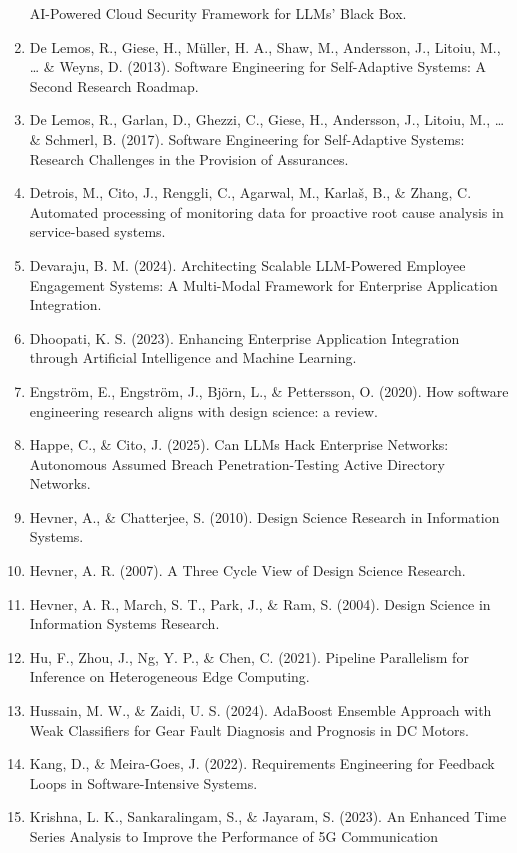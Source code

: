 \documentclass[
  a4paper,
  12pt,
  oneside,
  open=any,
  BCOR=12mm,
  DIV=14,
  parskip=half*,
  headsepline,
  footsepline,
  pointlessnumbers,
  liststotoc,
  numbers=noenddot,
  listof=totoc]{scrartcl}
\begin{document}
\begin{enumerate}
  AI-Powered Cloud Security Framework for LLMs' Black Box.
\item
  De Lemos, R., Giese, H., Müller, H. A., Shaw, M., Andersson, J.,
  Litoiu, M., \ldots{} \& Weyns, D. (2013). Software Engineering for
  Self-Adaptive Systems: A Second Research Roadmap.
\item
  De Lemos, R., Garlan, D., Ghezzi, C., Giese, H., Andersson, J.,
  Litoiu, M., \ldots{} \& Schmerl, B. (2017). Software Engineering for
  Self-Adaptive Systems: Research Challenges in the Provision of
  Assurances.
\item
  Detrois, M., Cito, J., Renggli, C., Agarwal, M., Karlaš, B., \& Zhang,
  C. Automated processing of monitoring data for proactive root cause
  analysis in service-based systems.
\item
  Devaraju, B. M. (2024). Architecting Scalable LLM-Powered Employee
  Engagement Systems: A Multi-Modal Framework for Enterprise Application
  Integration.
\item
  Dhoopati, K. S. (2023). Enhancing Enterprise Application Integration
  through Artificial Intelligence and Machine Learning.
\item
  Engström, E., Engström, J., Björn, L., \& Pettersson, O. (2020). How
  software engineering research aligns with design science: a review.
\item
  Happe, C., \& Cito, J. (2025). Can LLMs Hack Enterprise Networks:
  Autonomous Assumed Breach Penetration-Testing Active Directory
  Networks.
\item
  Hevner, A., \& Chatterjee, S. (2010). Design Science Research in
  Information Systems.
\item
  Hevner, A. R. (2007). A Three Cycle View of Design Science Research.
\item
  Hevner, A. R., March, S. T., Park, J., \& Ram, S. (2004). Design
  Science in Information Systems Research.
\item
  Hu, F., Zhou, J., Ng, Y. P., \& Chen, C. (2021). Pipeline Parallelism
  for Inference on Heterogeneous Edge Computing.
\item
  Hussain, M. W., \& Zaidi, U. S. (2024). AdaBoost Ensemble Approach
  with Weak Classifiers for Gear Fault Diagnosis and Prognosis in DC
  Motors.
\item
  Kang, D., \& Meira-Goes, J. (2022). Requirements Engineering for
  Feedback Loops in Software-Intensive Systems.
\item
  Krishna, L. K., Sankaralingam, S., \& Jayaram, S. (2023). An Enhanced
  Time Series Analysis to Improve the Performance of 5G Communication

\end{enumerate}
\end{document}
